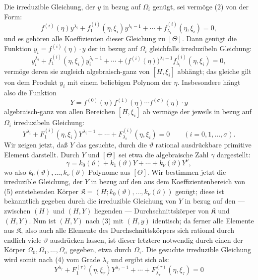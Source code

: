 \documentclass[11pt]{article}
\begin{document}
Die irreduzible Gleichung, der $y$ in bezug auf $\Omega_i$ genügt, sei vermöge
(2) von der Form:
\[
 f^{(i)}(\eta)y^{\lambda_i}+f_1^{(i)}(\eta,\xi_i)y^{\lambda_i-1}
+\cdots+f_{\lambda_i}^{(i)}(\eta,\xi_i)=0,
\]
und es gehören alle Koeffizienten dieser Gleichung zu $[\Theta]$. Dann genügt
die Funktion $y_i=f^{(i)}(\eta)\cdot y$ der in bezug auf $\Omega_i$ gleichfalls
irreduzibeln Gleichung:
\[
 y_i^{\lambda_i}+f_1^{(i)}(\eta,\xi_i)y_i^{\lambda_i-1}
+\cdots+\bigl(f^{(i)}(\eta)\bigr)^{\lambda_i-1}
 f_{\lambda_i}^{(i)}(\eta,\xi_i)=0,
\]
vermöge deren sie zugleich algebraisch-ganz von $[H,\xi_i]$ abhängt; das
gleiche gilt von dem Produkt $y_i$ mit einem beliebigen Polynom der $\eta$.
Insbesondere hängt also die Funktion
\begin{equation}
Y=f^{(0)}(\eta)f^{(1)}(\eta)\cdots f^{(\sigma)}(\eta)\cdot y
\tag{3}
\end{equation}
algebraisch-ganz von allen Bereichen $[H,\xi_i]$ ab vermöge der jeweils in bezug
auf $\Omega_i$ irreduzibeln Gleichung:
\begin{equation}
Y^{\lambda_i}+F_1^{(i)}(\eta,\xi_i)Y^{\lambda_i-1}
+\cdots+F_{\lambda_i}^{(i)}(\eta,\xi_i)=0
\qquad (i=0,1,\ldots,\sigma).
\tag{4}
\end{equation}
Wir zeigen jetzt, daß $Y$ das gesuchte, durch die $\vartheta$ rational
ausdrückbare primitive Element darstellt. Durch $Y$ und $[\Theta]$ sei etwa die
algebraische Zahl $\gamma$ dargestellt:
\begin{equation}
\gamma=k_0(\vartheta)+k_1(\vartheta)Y+\cdots+k_\nu(\vartheta)Y^\nu,
\tag{5}
\end{equation}
wo also $k_0(\vartheta),\ldots,k_\nu(\vartheta)$ Polynome aus $[\Theta]$. Wir
bestimmen jetzt die irreduzible Gleichung, der $Y$ in bezug auf den aus dem
Koeffizientenbereich von (5) entstehenden Körper
$\mathfrak K=(H;k_0(\vartheta),\ldots,k_\nu(\vartheta))$ genügt; diese ist
bekanntlich gegeben durch die irreduzible Gleichung von $Y$ in bezug auf den
--- zwischen $(H)$ und $(H,Y)$ liegenden --- Durchschnittskörper von
$\mathfrak K$ und $(H,Y)$. Nun ist $(H,Y)$ nach (3) mit $(H,y)$ identisch; da
ferner alle Elemente aus $\mathfrak K$, also auch alle Elemente des
Durchschnittskörpers sich rational durch endlich viele $\vartheta$ ausdrücken
lassen, ist dieser letztere notwendig durch einen der Körper
$\Omega_0,\Omega_1,\ldots,\Omega_\sigma$ gegeben, etwa durch $\Omega_\tau$.
Die gesuchte irreduzible Gleichung wird somit nach (4) vom Grade
$\lambda_\tau$ und ergibt sich als:
\begin{equation}
Y^{\lambda_\tau}+F_1^{(\tau)}(\eta,\xi_\tau)Y^{\lambda_\tau-1}
+\cdots+F_{\lambda_\tau}^{(\tau)}(\eta,\xi_\tau)=0
\tag{6}
\end{equation}
\end{document}
